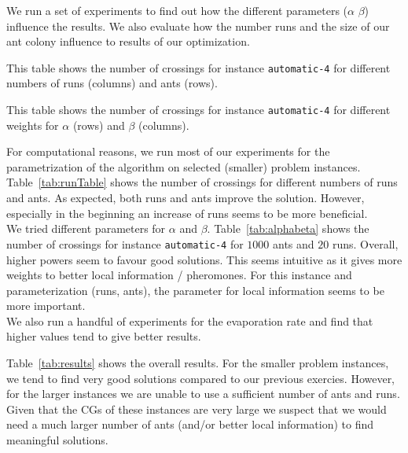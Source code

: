 \documentclass{scrartcl}
\begin{document}
We run a set of experiments to find out how the different parameters
($\alpha$ $\beta$) influence the results. We also evaluate how the
number runs and the size of our ant colony influence to results of our
optimization. \\


\begin{table}[!H]
\centering
\scriptsize  

\caption{This table shows the number of crossings for instance \texttt{automatic-4} for
different numbers of runs (columns) and ants (rows).}
\label{tab:runTable}
\end{table}


\begin{table}[!H]
\centering
\scriptsize  

\caption{This table shows the number of crossings for instance \texttt{automatic-4} for
different weights for $\alpha$ (rows) and $\beta$ (columns).}
\label{tab:alphabeta}
\end{table}


For computational reasons, we run most of our experiments for the parametrization of
the algorithm on selected
(smaller) problem instances. Table~\ref{tab:runTable} shows the number
of crossings for different numbers of runs and ants. As expected, both
runs and ants improve the solution. However, especially in the
beginning an increase of runs seems to be more beneficial.\\

We tried different parameters for $\alpha$ and
$\beta$. Table~\ref{tab:alphabeta} shows the number of crossings for
instance \texttt{automatic-4} for $1000$ ants and $20$ runs.  Overall,
higher powers seem to favour good solutions. This seems intuitive as
it gives more weights to better local information / pheromones. For
this instance and parameterization (runs, ants), the parameter for
local information seems to be more important. \\

We also run a handful of experiments for the evaporation rate and find that
higher values tend to give better results.

Table~\ref{tab:results} shows the overall results. For the smaller
problem instances, we tend to find very good solutions compared to our
previous exercies. However, for the larger instances we are unable to
use a sufficient number of ants and runs. Given that the CGs of these
instances are very large we suspect that we would need a much larger
number of ants (and/or better local information) to find meaningful
solutions.
\end{document}
